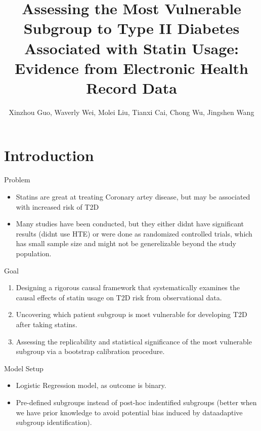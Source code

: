 \documentclass{beamer}\usepackage{listings}
\institute{University of Copenhagen}
\subtitle{Xinzhou Guo, Waverly Wei, Molei Liu, Tianxi Cai, Chong Wu, Jingshen Wang}
\date{}
\title{Assessing the Most Vulnerable Subgroup to Type II Diabetes Associated with Statin Usage: Evidence from Electronic Health Record Data}
\begin{document}
\maketitle
\section{Introduction}
\label{sec:org591d8b5}

\begin{frame}[label={sec:org182dbca}]{Problem}
\begin{itemize}
\item Statins are great at treating Coronary artey disease, but may be associated with increased risk of T2D
\item Many studies have been conducted, but they either didnt have significant results (didnt use HTE) or were done as randomized controlled trials, which
has small sample size and might not be generelizable beyond the study population.
\end{itemize}
\end{frame}

\begin{frame}[label={sec:orgb8f69cc}]{Goal}
\begin{enumerate}
\item Designing a rigorous causal framework that systematically
examines the causal effects of statin usage on T2D risk from observational data.\pause
\item Uncovering which patient subgroup is most vulnerable for developing T2D after
taking statins.\pause
\item Assessing the replicability and statistical significance of the most vulnerable
subgroup via a bootstrap calibration procedure.
\end{enumerate}
\end{frame}

\begin{frame}[label={sec:org75767e8}]{Model Setup}
\begin{itemize}
\item Logistic Regression model, as outcome is binary.
\item Pre-defined subgroups instead of post-hoc indentified subgroups (better when we have
prior knowledge to avoid potential bias induced by dataadaptive subgroup identification).
\end{itemize}
\end{frame}
\end{document}
